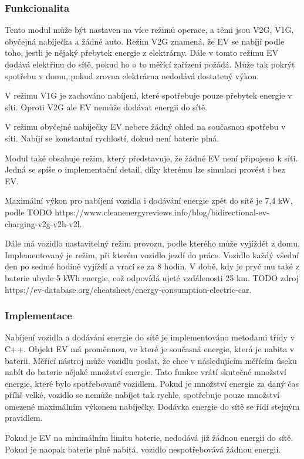 \documentclass[12pt,a4paper]{article}
\begin{document}
\subsubsection{Funkcionalita}
Tento modul může být nastaven na více režimů operace, a těmi jsou V2G, V1G, obyčejná nabíječka a žádné auto.
Režim V2G znamená, že EV se nabíjí podle toho, jestli je nějaký přebytek energie z elektrárny.
Dále v tomto režimu EV dodává elektřinu do sítě, pokud ho o to měřící zařízení požádá.
Může tak pokrýt spotřebu v domu, pokud zrovna elektrárna nedodává dostatený výkon.

V režimu V1G je zachováno nabíjení, které spotřebuje pouze přebytek energie v síti.
Oproti V2G ale EV nemůže dodávat energii do sítě.

V režimu obyčejné nabíječky EV nebere žádný ohled na současnou spotřebu v síti.
Nabíjí se konstantní rychlostí, dokud není baterie plná.

Modul také obsahuje režim, který představuje, že žádné EV není připojeno k síti.
Jedná se spíše o implementační detail, díky kterému lze simulaci provést i bez EV.

Maximální výkon pro nabíjení vozidla i dodávání energie zpět do sítě je 7,4 kW, podle TODO https://www.cleanenergyreviews.info/blog/bidirectional-ev-charging-v2g-v2h-v2l.

Dále má vozidlo nastavitelný režim provozu, podle kterého může vyjíždět z domu.
Implementovaný je režim, při kterém vozidlo jezdí do práce.
Vozidlo každý všední den po sedmé hodině vyjíždí a vrací se za 8 hodin.
V době, kdy je pryč mu také z baterie ubyde 5 kWh energie,
což odpovídá ujeté vzdálenosti 25 km. TODO zdroj https://ev-database.org/cheatsheet/energy-consumption-electric-car.

\subsubsection{Implementace}
Nabíjení vozidla a dodávání energie do sítě je implementováno metodami třídy v C++.
Objekt EV má proměnnou, ve které je současná energie, která je nabita v baterii.
Měřící nástroj může vozidlu poslat, že chce v následujícím měřícím úseku nabít do baterie nějaké množství energie.
Tato funkce vrátí skutečné množství energie, které bylo spotřebované vozidlem.
Pokud je množství energie za daný čas příliš velké,
vozidlo se nemůže nabíjet tak rychle, spotřebuje pouze množství omezené maximálním výkonem nabíječky.
Dodávka energie do sítě se řídí stejným pravidlem.

Pokud je EV na minimálním limitu baterie, nedodává již žádnou energii do sítě.
Pokud je naopak baterie plně nabitá, vozidlo nespotřebovává žádnou energii.
\end{document}
